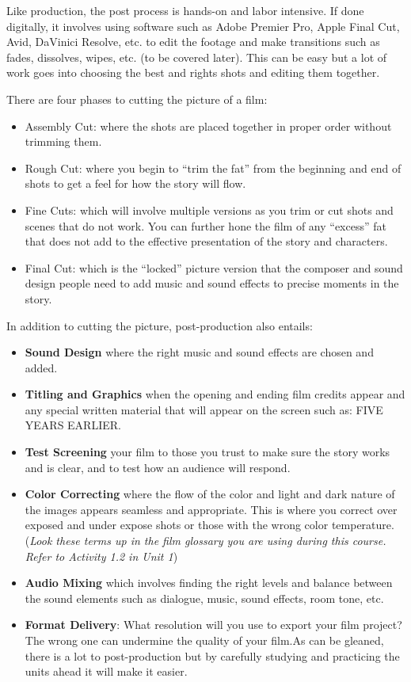 \documentclass[
]{book}
\providecommand{\tightlist}{%
  \setlength{\itemsep}{0pt}\setlength{\parskip}{0pt}}
\begin{document}
Like production, the post process is hands-on and labor intensive. If done digitally, it involves using software such as Adobe Premier Pro, Apple Final Cut, Avid, DaVinici Resolve, etc. to edit the footage and make transitions such as fades, dissolves, wipes, etc. (to be covered later). This can be easy but a lot of work goes into choosing the best and rights shots and editing them together.

There are four phases to cutting the picture of a film:

\begin{itemize}
\tightlist
\item
  Assembly Cut: where the shots are placed together in proper order without trimming them.\\
\item
  Rough Cut: where you begin to ``trim the fat'' from the beginning and end of shots to get a feel for how the story will flow.\\
\item
  Fine Cuts: which will involve multiple versions as you trim or cut shots and scenes that do not work. You can further hone the film of any ``excess'' fat that does not add to the effective presentation of the story and characters.\\
\item
  Final Cut: which is the ``locked'' picture version that the composer and sound design people need to add music and sound effects to precise moments in the story.
\end{itemize}

In addition to cutting the picture, post-production also entails:

\begin{itemize}
\item
  \textbf{Sound Design} where the right music and sound effects are chosen and added.
\item
  \textbf{Titling and Graphics} when the opening and ending film credits appear and any special written material that will appear on the screen such as: FIVE YEARS EARLIER.
\item
  \textbf{Test Screening} your film to those you trust to make sure the story works and is clear, and to test how an audience will respond.
\item
  \textbf{Color Correcting} where the flow of the color and light and dark nature of the images appears seamless and appropriate. This is where you correct over exposed and under expose shots or those with the wrong color temperature. (\emph{Look these terms up in the film glossary you are using during this course. Refer to Activity 1.2 in Unit 1})
\item
  \textbf{Audio Mixing} which involves finding the right levels and balance between the sound elements such as dialogue, music, sound effects, room tone, etc.
\item
  \textbf{Format Delivery}: What resolution will you use to export your film project? The wrong one can undermine the quality of your film.As can be gleaned, there is a lot to post-production but by carefully studying and practicing the units ahead it will make it easier.
\end{itemize}
\end{document}
